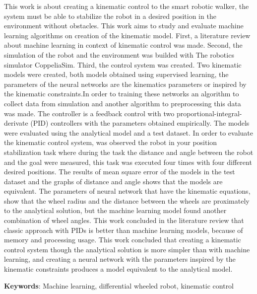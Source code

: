 This work is about creating a kinematic control to the smart robotic walker,
the system must be able to stabilize the robot in a desired position
in the environment without obstacles. This work aims to study and evaluate
machine learning algorithms
on creation of the kinematic model. First, a literature review about
machine learning in context of kinematic control was made. Second, the
simulation of the robot and the environment was builded with The robotics
simulator CoppeliaSim. Third, the control system was created.
Two kinematic models were created, both models obtained using supervised learning,
the parameters of the neural networks are the kinematics parameters or
inspired by the kinematic constraints.In order to training these networks
an algorithm to collect data from simulation
 and another algorithm to preprocessing this data was made. The controller
is a feedback control with two proportional-integral-derivate (PID) controllers
with the parameters obtained empirically. The models were evaluated using the
analytical model and a test dataset. In order to evaluate the kinematic
control system, was observed the robot in your position stabilization
task where during the task the distance and angle between the robot and
the goal were measured, this task was executed four times with four different
desired positions.
The results of mean square error of the models in the test dataset and
the graphs of distance and angle shows that the models are equivalent.
The parameters of neural network
that have the kinematic equations, show that the wheel radius and the
distance between the wheels are proximately to the analytical solution, but
the machine learning model found another combination of wheel angles.
This work concluded in the literature review that classic approach
with PIDs is better than machine learning models, because of memory
and processing usage. This work concluded that creating a kinematic
control system though the analytical solution is more simpler than
with machine learning, and creating a neural network with the parameters
inspired by the kinematic constraints produces a model equivalent to
the analytical model.



\vspace{1.5ex}

{\bf Keywords}: Machine learning, differential wheeled robot, kinematic control





